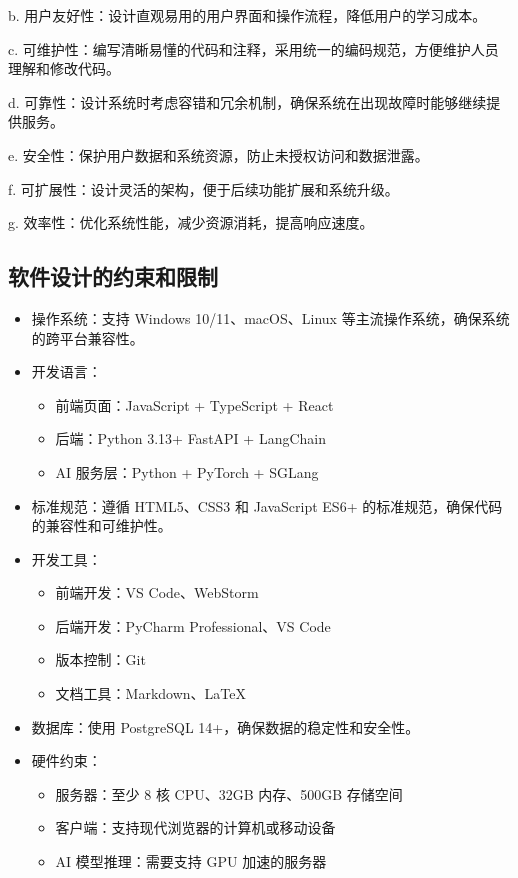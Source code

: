 \documentclass[
    report,     %
    oneside,    %
    UTF8,       %
    zihao=-4    %
]{config} %
\begin{document}
b. 用户友好性：设计直观易用的用户界面和操作流程，降低用户的学习成本。

c. 可维护性：编写清晰易懂的代码和注释，采用统一的编码规范，方便维护人员理解和修改代码。

d. 可靠性：设计系统时考虑容错和冗余机制，确保系统在出现故障时能够继续提供服务。

e. 安全性：保护用户数据和系统资源，防止未授权访问和数据泄露。

f. 可扩展性：设计灵活的架构，便于后续功能扩展和系统升级。

g. 效率性：优化系统性能，减少资源消耗，提高响应速度。
\subsection{软件设计的约束和限制}
\begin{itemize}
    \item 操作系统：支持 Windows 10/11、macOS、Linux 等主流操作系统，确保系统的跨平台兼容性。
    \item 开发语言：
        \begin{itemize}
            \item 前端页面：JavaScript + TypeScript + React
            \item 后端：Python 3.13+ FastAPI + LangChain
            \item AI 服务层：Python + PyTorch + SGLang
        \end{itemize}
    \item 标准规范：遵循 HTML5、CSS3 和 JavaScript ES6+ 的标准规范，确保代码的兼容性和可维护性。
    \item 开发工具：
        \begin{itemize}
            \item 前端开发：VS Code、WebStorm
            \item 后端开发：PyCharm Professional、VS Code
            \item 版本控制：Git
            \item 文档工具：Markdown、LaTeX
        \end{itemize}
    \item 数据库：使用 PostgreSQL 14+，确保数据的稳定性和安全性。
    \item 硬件约束：
        \begin{itemize}
            \item 服务器：至少 8 核 CPU、32GB 内存、500GB 存储空间
            \item 客户端：支持现代浏览器的计算机或移动设备
            \item AI 模型推理：需要支持 GPU 加速的服务器

\end{itemize}
\end{itemize}
\end{document}

